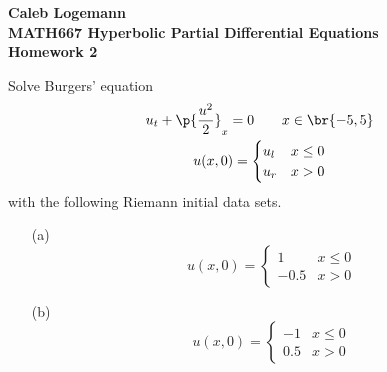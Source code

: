 \documentclass[11pt, oneside]{article}
\begin{document}
\noindent \textbf{\Large{Caleb Logemann \\
MATH667 Hyperbolic Partial Differential Equations \\
Homework 2
}}

%
Solve Burgers' equation
\begin{gather}
    u_t + \p{\frac{u^2}{2}}_x = 0 \qquad x \in \br{-5, 5} \\
    u(x, 0) = 
    \begin{cases}
      u_l & x \le 0 \\
      u_r & x > 0
    \end{cases}
\end{gather}
with the following Riemann initial data sets.

\begin{enumerate}
  \item[(a)]
    \[
      u(x, 0) =
      \begin{cases}
        1 & x \le 0 \\
        -0.5 & x > 0
      \end{cases}
    \]

  \item[(b)]
    \[
      u(x, 0) =
      \begin{cases}
        -1 & x \le 0 \\
        0.5 & x > 0
      \end{cases}
    \]
\end{enumerate}
\end{document}
